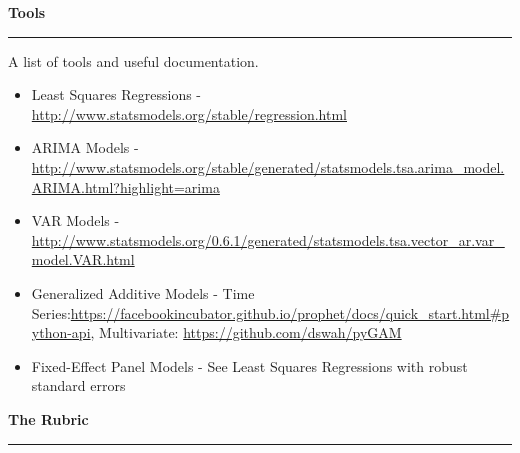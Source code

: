 \documentclass{article}
\begin{document}
\vspace*{2em}
\noindent \Large \textbf{Tools}\\[-.8em]\hrule \vspace*{.5em}
\large \noindent A list of tools and useful documentation.\vspace*{.5em}

\begin{itemize}

\item Least Squares Regressions - \url{http://www.statsmodels.org/stable/regression.html}
\item ARIMA Models - \url{http://www.statsmodels.org/stable/generated/statsmodels.tsa.arima_model.ARIMA.html?highlight=arima}
\item VAR Models - \url{http://www.statsmodels.org/0.6.1/generated/statsmodels.tsa.vector_ar.var_model.VAR.html}
\item Generalized Additive Models - Time Series:\url{https://facebookincubator.github.io/prophet/docs/quick_start.html#python-api}, Multivariate: \url{https://github.com/dswah/pyGAM}
\item Fixed-Effect Panel Models - See Least Squares Regressions with robust standard errors

\end{itemize}

\vspace*{2em}


\noindent \Large \textbf{The Rubric}\\[-.8em]\hrule \vspace*{.5em}
\end{document}
